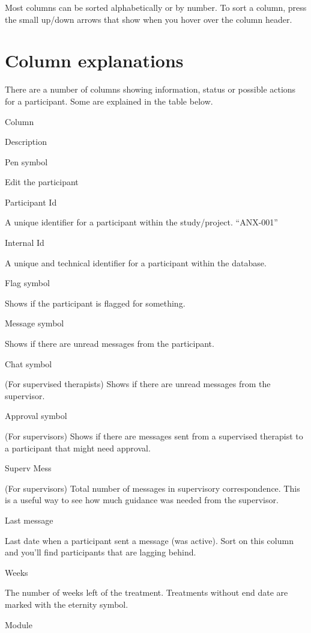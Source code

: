 \documentclass[]{book}
\begin{document}
Most columns can be sorted alphabetically or by number. To sort a column, press the small up/down arrows that show when you hover over the column header.

\hypertarget{column-explanations}{%
\section{Column explanations}\label{column-explanations}}

There are a number of columns showing information, status or possible actions for a participant. Some are explained in the table below.

Column

Description

Pen symbol

Edit the participant

Participant Id

A unique identifier for a participant within the study/project. ``ANX-001''

Internal Id

A unique and technical identifier for a participant within the database.

Flag symbol

Shows if the participant is flagged for something.

Message symbol

Shows if there are unread messages from the participant.

Chat symbol

(For supervised therapists)
Shows if there are unread messages from the supervisor.

Approval symbol

(For supervisors)
Shows if there are messages sent from a supervised therapist to a participant that might need approval.

Superv Mess

(For supervisors)
Total number of messages in supervisory correspondence. This is a useful way to see how much guidance was needed from the supervisor.

Last message

Last date when a participant sent a message (was active). Sort on this column and you'll find participants that are lagging behind.

Weeks

The number of weeks left of the treatment.
Treatments without end date are marked with the eternity symbol.

Module
\end{document}
